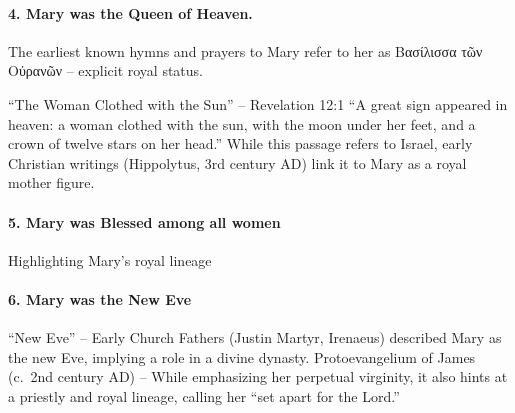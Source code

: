 \paragraph{4.
Mary was the Queen of Heaven.}\label{par:sec:mary-was-the-queen-of-heaven.}

The earliest known hymns and prayers to Mary refer to her as Βασίλισσα τῶν Οὐρανῶν -- explicit royal status.

``The Woman Clothed with the Sun'' -- Revelation 12:1 ``A great sign appeared in heaven: a woman clothed with the sun, with the moon under her feet, and a crown of twelve stars on her head.'' While this passage refers to Israel, early Christian writings (Hippolytus, 3rd century AD) link it to Mary as a royal mother figure.

\paragraph{5.
Mary was Blessed among all women}\label{par:sec:mary-was-blessed-among-all-women}

Highlighting Mary's royal lineage

\paragraph{6.
Mary was the New Eve}\label{par:sec:mary-was-the-new-eve}

``New Eve'' -- Early Church Fathers (Justin Martyr, Irenaeus) described Mary as the new Eve, implying a role in a divine dynasty.
Protoevangelium of James (c.~2nd century AD) -- While emphasizing her perpetual virginity, it also hints at a priestly and royal lineage, calling her ``set apart for the Lord.''
